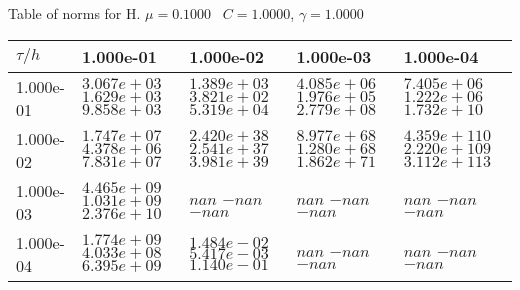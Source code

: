 \begin{center}
Table of norms for H. $\mu = 0.1000$ \, $C = 1.0000$, $\gamma = 1.0000$
  
\begin{tabular}{|p{1in}|p{1in}|p{1in}|p{1in}|p{1in}|} \hline
$\tau / h$ &1.000e-01 &1.000e-02 &1.000e-03 &1.000e-04 \\ \hline 
1.000e-01 & $3.067e+03$  $1.629e+03$  $9.858e+03$  & $1.389e+03$  $3.821e+02$  $5.319e+04$  & $4.085e+06$  $1.976e+05$  $2.779e+08$  & $7.405e+06$  $1.222e+06$  $1.732e+10$  \\ \hline 
1.000e-02 & $1.747e+07$  $4.378e+06$  $7.831e+07$  & $2.420e+38$  $2.541e+37$  $3.981e+39$  & $8.977e+68$  $1.280e+68$  $1.862e+71$  & $4.359e+110$  $2.220e+109$  $3.112e+113$  \\ \hline 
1.000e-03 & $4.465e+09$  $1.031e+09$  $2.376e+10$  & $nan$  $-nan$  $-nan$  & $nan$  $-nan$  $-nan$  & $nan$  $-nan$  $-nan$  \\ \hline 
1.000e-04 & $1.774e+09$  $4.033e+08$  $6.395e+09$  & $1.484e-02$  $5.417e-03$  $1.140e-01$  & $nan$  $-nan$  $-nan$  & $nan$  $-nan$  $-nan$  \\ \hline 

\end{tabular}\\[20pt]
\end{center}
